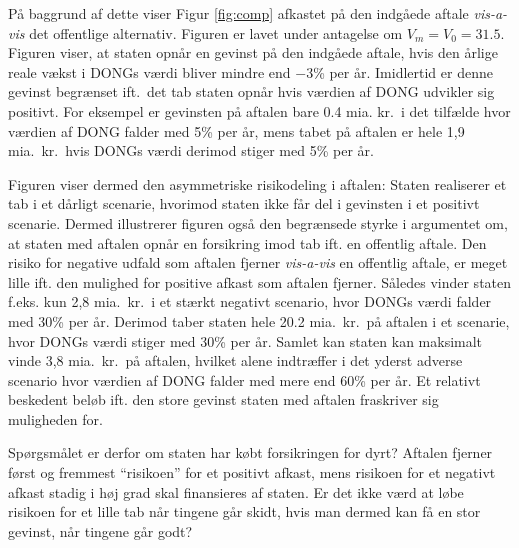 \documentclass{article}
\begin{document}
På baggrund af dette viser Figur \ref{fig:comp} afkastet på den indgåede aftale \emph{vis-a-vis} det offentlige alternativ. Figuren er lavet under antagelse om  $V_m=V_0=31.5$. Figuren viser, at staten opnår en gevinst på den indgåede aftale, hvis den årlige reale vækst i DONGs værdi bliver mindre end $-3$\% per år. Imidlertid er denne gevinst begrænset ift.\ det tab staten opnår hvis værdien af DONG udvikler sig positivt. For eksempel er gevinsten på aftalen bare 0.4 mia. kr.\ i det tilfælde hvor værdien af DONG falder med 5\% per år, mens tabet på aftalen er hele 1,9 mia.\ kr.\ hvis DONGs værdi derimod stiger med 5\% per år.

Figuren viser dermed den asymmetriske risikodeling i aftalen: Staten realiserer et tab i et dårligt scenarie, hvorimod staten ikke får del i gevinsten i et positivt scenarie. Dermed illustrerer figuren også den begrænsede styrke i argumentet om, at staten med aftalen opnår en forsikring imod tab ift. en offentlig aftale. Den risiko for negative udfald som aftalen fjerner \emph{vis-a-vis} en offentlig aftale, er meget lille ift. den mulighed for positive afkast som aftalen fjerner. Således vinder staten f.eks. kun 2,8 mia.\ kr.\ i et stærkt negativt scenario, hvor DONGs værdi falder med 30\% per år. Derimod taber staten hele 20.2 mia.\ kr.\ på aftalen i et scenarie, hvor DONGs værdi stiger med 30\% per år. Samlet kan staten kan maksimalt vinde 3,8 mia.\ kr.\ på aftalen, hvilket alene indtræffer i det yderst adverse scenario hvor værdien af DONG falder med mere end 60\% per år. Et relativt beskedent beløb ift. den store gevinst staten med aftalen fraskriver sig muligheden for.

Spørgsmålet er derfor om staten har købt forsikringen for dyrt? Aftalen fjerner først og fremmest \enquote{risikoen} for et positivt afkast, mens risikoen for et negativt afkast stadig i høj grad skal finansieres af staten. Er det ikke værd at løbe risikoen for et lille tab når tingene går skidt, hvis man dermed kan få en stor gevinst, når tingene går godt?
\end{document}
